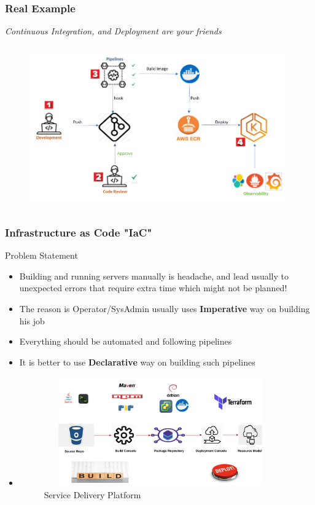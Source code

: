 \documentclass{beamer}
\begin{document}
		\begin{frame}
			\frametitle{Real Example}
			\textit{Continuous Integration, and Deployment are your friends}
			
			\vspace{1mm}
			
			\begin{figure}[h]
				\includegraphics[width=110mm, height=70mm, scale=1]{img/all-in-one.png}
			\end{figure}\vspace{1mm}
			
		\end{frame}
	
	\begin{frame}
		\frametitle{Infrastructure as Code \textbf{"IaC"}}
		Problem Statement
		\begin{itemize}
			\item<1->[] \scriptsize{Building and running servers manually is headache, and lead usually to unexpected errors that require extra time which might not be planned!}
			\vspace{1mm}
			\item<2-> \scriptsize{The reason is Operator/SysAdmin usually uses \textbf{Imperative} way on building his job}
			\item<3-> \scriptsize{Everything should be automated and following pipelines}
			\item<4-> \scriptsize{It is better to use \textbf{Declarative} way on building such pipelines}
			\item<4->[]
			\begin{figure}[h]
				\includegraphics[width=100mm,height= 47mm, scale=1]{img/service-delivery-platform.png}
				\caption{Service Delivery Platform}
			\end{figure}
		\end{itemize}
	\end{frame}
\end{document}
